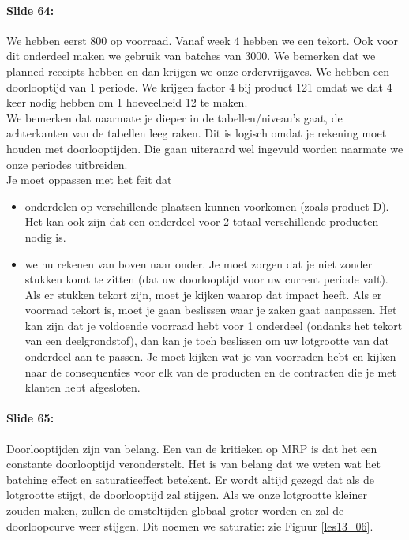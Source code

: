 \documentclass[10pt,a4paper]{report}
\begin{document}
\paragraph{Slide 64:} We hebben eerst 800 op voorraad. Vanaf week 4 hebben we een tekort. Ook voor dit onderdeel maken we gebruik van batches van 3000. We bemerken dat we planned receipts hebben en dan krijgen we onze ordervrijgaves. We hebben een doorlooptijd van 1 periode. We krijgen factor 4 bij product 121 omdat we dat 4 keer nodig hebben om 1 hoeveelheid 12 te maken.\\
We bemerken dat naarmate je dieper in de tabellen/niveau's gaat, de achterkanten van de tabellen leeg raken. Dit is logisch omdat je rekening moet houden met doorlooptijden. Die gaan uiteraard wel ingevuld worden naarmate we onze periodes uitbreiden.\\
Je moet oppassen met het feit dat
\begin{itemize}
\item onderdelen op verschillende plaatsen kunnen voorkomen (zoals product D). Het kan ook zijn dat een onderdeel voor 2 totaal verschillende producten nodig is. 
\item we nu rekenen van boven naar onder. Je moet zorgen dat je niet zonder stukken komt te zitten (dat uw doorlooptijd voor uw current periode valt). Als er stukken tekort zijn, moet je kijken waarop dat impact heeft. Als er voorraad tekort is, moet je gaan beslissen waar je zaken gaat aanpassen. Het kan zijn dat je voldoende voorraad hebt voor 1 onderdeel (ondanks het tekort van een deelgrondstof), dan kan je toch beslissen om uw lotgrootte van dat onderdeel aan te passen. Je moet kijken wat je van voorraden hebt en kijken naar de consequenties voor elk van de producten en de contracten die je met klanten hebt afgesloten. 
\end{itemize}

\paragraph{Slide 65:} Doorlooptijden zijn van belang. Een van de kritieken op MRP is dat het een constante doorlooptijd veronderstelt. Het is van belang dat we weten wat het batching effect en saturatieeffect betekent. Er wordt altijd gezegd dat als  de lotgrootte stijgt,  de doorlooptijd zal stijgen. Als we onze lotgrootte kleiner zouden maken, zullen de omsteltijden globaal groter worden en zal de doorloopcurve weer stijgen. Dit noemen we saturatie: zie Figuur \ref{les13_06}.
\end{document}
